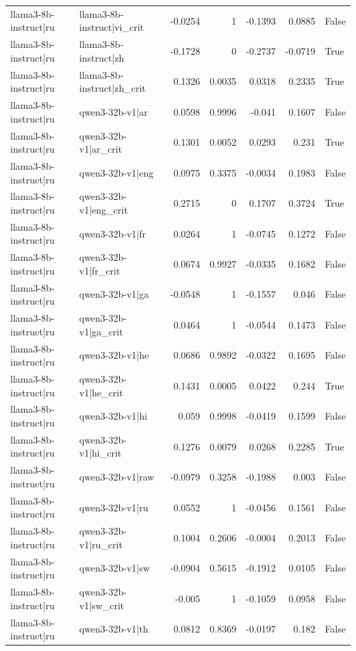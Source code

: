 \begin{table}
\begin{tabular}{l l r r r r l}
llama3-8b-instruct|ru & llama3-8b-instruct|vi_crit & -0.0254 & 1 & -0.1393 & 0.0885 & False \\
llama3-8b-instruct|ru & llama3-8b-instruct|zh & -0.1728 & 0 & -0.2737 & -0.0719 & True \\
llama3-8b-instruct|ru & llama3-8b-instruct|zh_crit & 0.1326 & 0.0035 & 0.0318 & 0.2335 & True \\
llama3-8b-instruct|ru & qwen3-32b-v1|ar & 0.0598 & 0.9996 & -0.041 & 0.1607 & False \\
llama3-8b-instruct|ru & qwen3-32b-v1|ar_crit & 0.1301 & 0.0052 & 0.0293 & 0.231 & True \\
llama3-8b-instruct|ru & qwen3-32b-v1|eng & 0.0975 & 0.3375 & -0.0034 & 0.1983 & False \\
llama3-8b-instruct|ru & qwen3-32b-v1|eng_crit & 0.2715 & 0 & 0.1707 & 0.3724 & True \\
llama3-8b-instruct|ru & qwen3-32b-v1|fr & 0.0264 & 1 & -0.0745 & 0.1272 & False \\
llama3-8b-instruct|ru & qwen3-32b-v1|fr_crit & 0.0674 & 0.9927 & -0.0335 & 0.1682 & False \\
llama3-8b-instruct|ru & qwen3-32b-v1|ga & -0.0548 & 1 & -0.1557 & 0.046 & False \\
llama3-8b-instruct|ru & qwen3-32b-v1|ga_crit & 0.0464 & 1 & -0.0544 & 0.1473 & False \\
llama3-8b-instruct|ru & qwen3-32b-v1|he & 0.0686 & 0.9892 & -0.0322 & 0.1695 & False \\
llama3-8b-instruct|ru & qwen3-32b-v1|he_crit & 0.1431 & 0.0005 & 0.0422 & 0.244 & True \\
llama3-8b-instruct|ru & qwen3-32b-v1|hi & 0.059 & 0.9998 & -0.0419 & 0.1599 & False \\
llama3-8b-instruct|ru & qwen3-32b-v1|hi_crit & 0.1276 & 0.0079 & 0.0268 & 0.2285 & True \\
llama3-8b-instruct|ru & qwen3-32b-v1|raw & -0.0979 & 0.3258 & -0.1988 & 0.003 & False \\
llama3-8b-instruct|ru & qwen3-32b-v1|ru & 0.0552 & 1 & -0.0456 & 0.1561 & False \\
llama3-8b-instruct|ru & qwen3-32b-v1|ru_crit & 0.1004 & 0.2606 & -0.0004 & 0.2013 & False \\
llama3-8b-instruct|ru & qwen3-32b-v1|sw & -0.0904 & 0.5615 & -0.1912 & 0.0105 & False \\
llama3-8b-instruct|ru & qwen3-32b-v1|sw_crit & -0.005 & 1 & -0.1059 & 0.0958 & False \\
llama3-8b-instruct|ru & qwen3-32b-v1|th & 0.0812 & 0.8369 & -0.0197 & 0.182 & False \\

\end{tabular}
\end{table}
